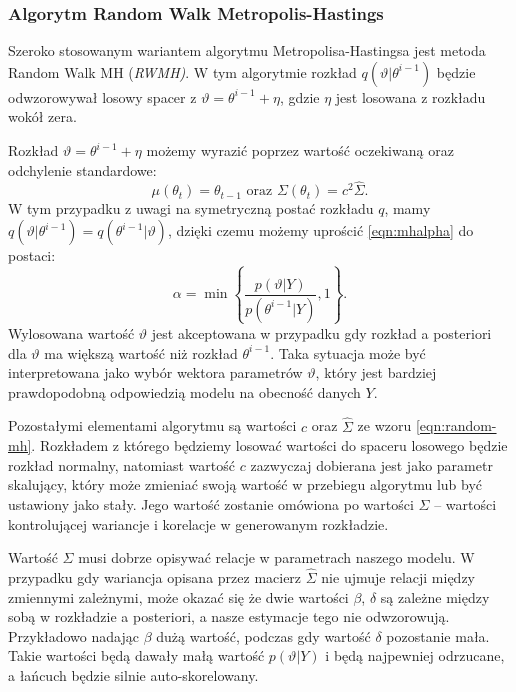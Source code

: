 \subsubsection{Algorytm Random Walk Metropolis-Hastings}
\label{sec:rwmh_algorithm}

Szeroko stosowanym wariantem algorytmu Metropolisa-Hastingsa jest metoda Random Walk MH (\emph{RWMH)}. W tym algorytmie rozkład $q(\vartheta|\theta^{i-1})$ będzie odwzorowywał losowy spacer z $\vartheta = \theta^{i-1} + \eta$, gdzie $\eta$ jest losowana z rozkładu wokół zera.

Rozkład $\vartheta = \theta^{i-1} + \eta$ możemy wyrazić poprzez wartość oczekiwaną oraz odchylenie standardowe:
\begin{equation}
    \label{eqn:random-mh}
    \mu(\theta_{t}) = \theta_{t-1} \text{ oraz } \Sigma(\theta_{t}) = c^2\hat{\Sigma}.
\end{equation}
W tym przypadku z uwagi na symetryczną postać rozkładu $q$, mamy $q(\vartheta|\theta^{i-1}) = q(\theta^{i-1}|\vartheta)$, dzięki czemu możemy uprościć \eqref{eqn:mhalpha} do postaci:
\begin{equation}
    \alpha = \min\left\{ \frac{p(\vartheta|Y)}{p(\theta^{i-1}|Y)}, 1\right\}.
\end{equation}
Wylosowana wartość $\vartheta$ jest akceptowana w przypadku gdy rozkład a posteriori dla $\vartheta$ ma większą wartość niż rozkład $\theta^{i-1}$. Taka sytuacja może być interpretowana jako wybór wektora parametrów $\vartheta$, który jest bardziej prawdopodobną odpowiedzią modelu na obecność danych $Y$.

Pozostałymi elementami algorytmu są wartości $c$ oraz $\hat{\Sigma}$ ze wzoru \eqref{eqn:random-mh}. Rozkładem z którego będziemy losować wartości do spaceru losowego będzie rozkład normalny, natomiast wartość $c$ zazwyczaj dobierana jest jako parametr skalujący, który może zmieniać swoją wartość w przebiegu algorytmu lub być ustawiony jako stały. Jego wartość zostanie omówiona po wartości $\Sigma$ -- wartości kontrolującej wariancje i korelacje w generowanym rozkładzie.

Wartość $\Sigma$ musi dobrze opisywać relacje w parametrach naszego modelu. W przypadku gdy wariancja opisana przez macierz $\hat{\Sigma}$ nie ujmuje relacji między zmiennymi zależnymi, może okazać się że dwie wartości $\beta$, $\delta$ są zależne między sobą w rozkładzie a posteriori, a nasze estymacje tego nie odwzorowują. Przykładowo nadając $\beta$ dużą wartość, podczas gdy wartość $\delta$ pozostanie mała. Takie wartości będą dawały małą wartość $p(\vartheta|Y)$ i będą najpewniej odrzucane, a łańcuch będzie silnie auto-skorelowany.

